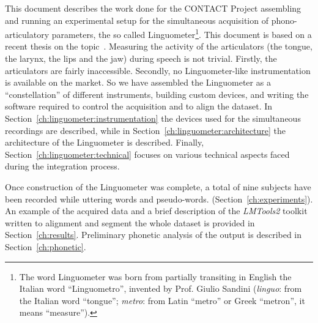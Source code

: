 This document
describes the work done for the 
CONTACT Project assembling and running an experimental setup for the 
simultaneous acquisition of phono-articulatory parameters, the so called 
Linguometer\footnote{The 
word Linguometer was born from partially transiting in English the Italian word
``Linguometro'', invented by Prof. Giulio Sandini
(\emph{linguo}: from the Italian word ``tongue''; \emph{metro}: from Latin 
``metro'' or Greek ``metron'', it means ``measure'').}.
This document is based on a recent thesis on 
the topic~\cite{tavella2007simultaneous}.
%
%
Measuring the activity of the articulators (the tongue, the larynx, the lips and
the jaw) during speech is not trivial. 
Firstly, the articulators are fairly inaccessible.
Secondly, no Linguometer-like instrumentation is available on the market.
So we have assembled the Linguometer as a ``constellation'' of
different instruments, building custom devices, and 
writing the software required to control the acquisition and to align the
dataset.
In Section~\ref{ch:linguometer:instrumentation} the devices
used for the simultaneous recordings are described, while in 
Section~\ref{ch:linguometer:architecture} the architecture of
the Linguometer is described. Finally, Section~\ref{ch:linguometer:technical}
focuses on various technical aspects faced during the integration
process.

Once construction of the Linguometer was complete, a total of nine
subjects have been recorded while uttering words and pseudo-words.
(Section~\ref{ch:experiments}).
An example of the acquired data and a brief description of the \emph{LMTools2}
toolkit written to alignment and segment
the whole dataset is provided in Section~\ref{ch:results}.
Preliminary phonetic analysis of the output is 
described in Section~\ref{ch:phonetic}.

\pagebreak
